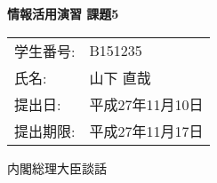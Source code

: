 \topmargin=-1.5cm
\textwidth=17cm
\textheight=25cm
\oddsidemargin=-0.5cm
\evensidemargin=-0.5cm


\begin{center}
  \Large\bf 情報活用演習 課題5
\end{center}

\begin{flushright}
  \begin{tabular}{ll}
    学生番号: & B151235 \\
    氏名:     & 山下 直哉 \\
    提出日:   & 平成27年11月10日 \\
    提出期限: & 平成27年11月17日 \\
  \end{tabular}
\end{flushright}

\begin{center}
  内閣総理大臣談話\\
\end{center}

